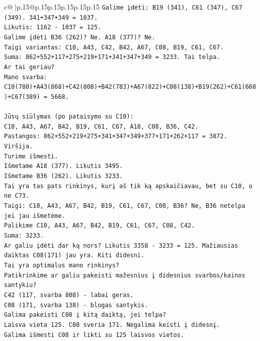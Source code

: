\documentclass{article}
\begin{document}
{\begin{supertabular}{c@{$\;$}|p{.15\linewidth}@{}p{.15\linewidth}p{.15\linewidth}p{.15\linewidth}p{.15\linewidth}p{.15\linewidth}}
{{{\texttt{Galime įdėti: B19 (341), C61 (347), C67 (349). 341+347+349 = 1037.} \\
\texttt{Likutis: 1162 {-} 1037 = 125.} \\
\texttt{Galime įdėti B36 (262)? Ne. A18 (377)? Ne.} \\
\texttt{Taigi variantas: C10, A43, C42, B42, A67, C08, B19, C61, C67.} \\
\texttt{Suma: 862+552+117+275+219+171+341+347+349 = 3233. Tai telpa.} \\
\texttt{Ar tai geriau?} \\
\texttt{Mano svarba: C10(780)+A43(868)+C42(808)+B42(783)+A67(822)+C08(138)+B19(262)+C61(668)+C67(389) = 5668.} \\
\\ 
\texttt{Jūsų siūlymas (po pataisymo su C10):} \\
\texttt{C10, A43, A67, B42, B19, C61, C67, A18, C08, B36, C42.} \\
\texttt{Pastangos: 862+552+219+275+341+347+349+377+171+262+117 = 3872. Viršija.} \\
\texttt{Turime išmesti.} \\
\texttt{Išmetame A18 (377). Likutis 3495.} \\
\texttt{Išmetame B36 (262). Likutis 3233.} \\
\texttt{Tai yra tas pats rinkinys, kurį aš tik ką apskaičiavau, bet su C10, o ne C73.} \\
\texttt{Taigi: C10, A43, A67, B42, B19, C61, C67, C08, B36? Ne, B36 netelpa jei jau išmetėme.} \\
\texttt{Palikime C10, A43, A67, B42, B19, C61, C67, C08, C42.} \\
\texttt{Suma: 3233.} \\
\texttt{Ar galiu įdėti dar ką nors? Likutis 3358 {-} 3233 = 125. Mažiausias daiktas C08(171) jau yra. Kiti didesni.} \\
\texttt{Tai yra optimalus mano rinkinys?} \\
\texttt{Patikrinkime ar galiu pakeisti mažesnius į didesnius svarbos/kainos santykiu?} \\
\texttt{C42 (117, svarba 808) {-} labai geras.} \\
\texttt{C08 (171, svarba 138) {-} blogas santykis.} \\
\texttt{Galima pakeisti C08 į kitą daiktą, jei telpa?} \\
\texttt{Laisva vieta 125. C08 sveria 171. Negalima keisti į didesnį.} \\
\texttt{Galima išmesti C08 ir likti su 125 laisvos vietos.} \\
}}}
\end{supertabular}}
\end{document}
